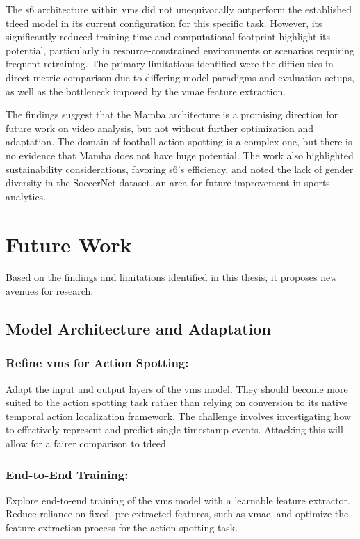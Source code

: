 The \acrshort{s6} architecture within \acrshort{vms} did not unequivocally outperform the established \acrshort{tdeed} model in its current configuration for this specific task. However, its significantly reduced training time and computational footprint highlight its potential, particularly in resource-constrained environments or scenarios requiring frequent retraining. The primary limitations identified were the difficulties in direct metric comparison due to differing model paradigms and evaluation setups, as well as the bottleneck imposed by the \acrshort{vmae} feature extraction.

The findings suggest that the Mamba architecture is a promising direction for future work on video analysis, but not without further optimization and adaptation. The domain of football action spotting is a complex one, but there is no evidence that Mamba does not have huge potential. The work also highlighted sustainability considerations, favoring \acrshort{s6}'s efficiency, and noted the lack of gender diversity in the SoccerNet dataset, an area for future improvement in sports analytics.


\section{Future Work}
\label{sec:future_work}
Based on the findings and limitations identified in this thesis, it proposes new avenues for research. 

\subsection{Model Architecture and Adaptation}

\subsubsection{Refine \acrshort{vms} for Action Spotting:} 
Adapt the input and output layers of the \acrshort{vms} model. They should become more suited to the action spotting task rather than relying on conversion to its native temporal action localization framework. The challenge involves investigating how to effectively represent and predict single-timestamp events. Attacking this will allow for a fairer comparison to \acrshort{tdeed}

\subsubsection{End-to-End Training:} 
Explore end-to-end training of the \acrshort{vms} model with a learnable feature extractor. Reduce reliance on fixed, pre-extracted features, such as \acrshort{vmae}, and optimize the feature extraction process for the action spotting task.


